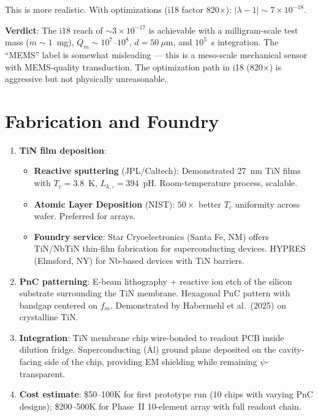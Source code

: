 \documentclass[11pt]{article}
\newcommand{\ee}[1]{\times 10^{#1}}
\newcommand{\lbone}{|\lambda - 1|}
\theoremstyle{definition}
\theoremstyle{remark}
\begin{document}
\begin{tcolorbox}[colback=red!5!white, colframe=red!60!black,
  title=\textbf{CRITICAL AUDIT: i18 MEMS DC Reach Requires Re-examination}]
This is more realistic. With optimizations (i18 factor 820$\times$):
$\lbone \sim 7\ee{-18}$.

\textbf{Verdict}: The i18 reach of $\sim 3\ee{-17}$ is achievable
with a milligram-scale test mass ($m \sim 1$~mg), $Q_m \sim 10^7$--$10^8$,
$d = 50~\mu$m, and $10^5$~s integration. The ``MEMS'' label is
somewhat misleading --- this is a meso-scale mechanical sensor with
MEMS-quality transduction. The optimization path in i18 (820$\times$)
is aggressive but not physically unreasonable.

\end{tcolorbox}


\section{Fabrication and Foundry}

\begin{enumerate}
\item \textbf{TiN film deposition}:
  \begin{itemize}[nosep]
  \item \textbf{Reactive sputtering} (JPL/Caltech): Demonstrated
    27~nm TiN films with $T_c = 3.8$~K, $L_{k,\square} = 394$~pH.
    Room-temperature process, scalable.
  \item \textbf{Atomic Layer Deposition} (NIST): $50\times$ better
    $T_c$ uniformity across wafer. Preferred for arrays.
  \item \textbf{Foundry service}: Star Cryoelectronics (Santa Fe, NM)
    offers TiN/NbTiN thin-film fabrication for superconducting
    devices. HYPRES (Elmsford, NY) for Nb-based devices with
    TiN barriers.
  \end{itemize}

\item \textbf{PnC patterning}: E-beam lithography + reactive ion
  etch of the silicon substrate surrounding the TiN membrane.
  Hexagonal PnC pattern with bandgap centered on $f_m$. Demonstrated
  by Habermehl et al.\ (2025) on crystalline TiN.

\item \textbf{Integration}: TiN membrane chip wire-bonded to
  readout PCB inside dilution fridge. Superconducting (Al) ground
  plane deposited on the cavity-facing side of the chip, providing
  EM shielding while remaining $\psi$-transparent.

\item \textbf{Cost estimate}: \$50--100K for first prototype run
  (10 chips with varying PnC designs); \$200--500K for Phase~II
  10-element array with full readout chain.
\end{enumerate}
\end{document}
